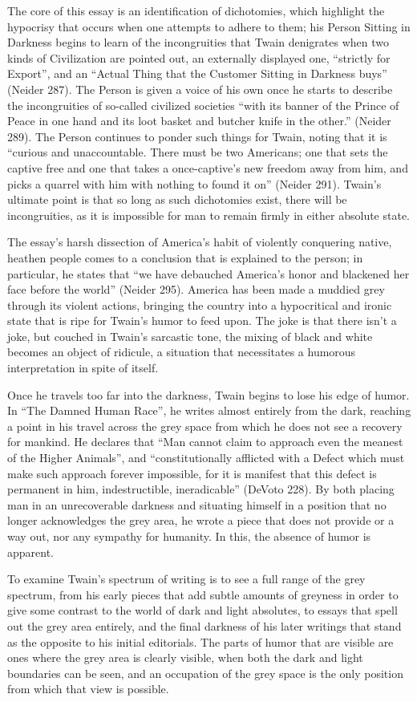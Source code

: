 The core of this essay is an identification of dichotomies, which highlight the
hypocrisy that occurs when one attempts to adhere to them; his Person Sitting in
Darkness begins to learn of the incongruities that Twain denigrates when two
kinds of Civilization are pointed out, an externally displayed one, ``strictly
for Export'', and an ``Actual Thing that the Customer Sitting in Darkness buys''
(Neider 287). The Person is given a voice of his own once he starts to describe
the incongruities of so-called civilized societies ``with its banner of the
Prince of Peace in one hand and its loot basket and butcher knife in the
other.'' (Neider 289).  The Person continues to ponder such things for Twain,
noting that it is ``curious and unaccountable. There must be two Americans; one
that sets the captive free and one that takes a once-captive's new freedom away
from him, and picks a quarrel with him with nothing to found it on'' (Neider
291). Twain's ultimate point is that so long as such dichotomies exist, there
will be incongruities, as it is impossible for man to remain firmly in either
absolute state.

The essay's harsh dissection of America's habit of violently conquering native,
heathen people comes to a conclusion that is explained to the person; in
particular, he states that ``we have debauched America's honor and blackened her
face before the world'' (Neider 295). America has been made a muddied grey
through its violent actions, bringing the country into a hypocritical and ironic
state that is ripe for Twain's humor to feed upon. The joke is that there isn't
a joke, but couched in Twain's sarcastic tone, the mixing of black and white
becomes an object of ridicule, a situation that necessitates a humorous
interpretation in spite of itself.

Once he travels too far into the darkness, Twain begins to lose his edge of
humor. In ``The Damned Human Race'', he writes almost entirely from the dark,
reaching a point in his travel across the grey space from which he does not see
a recovery for mankind. He declares that ``Man cannot claim to approach even the
meanest of the Higher Animals'', and ``constitutionally afflicted with a Defect
which must make such approach forever impossible, for it is manifest that this
defect is permanent in him, indestructible, ineradicable'' (DeVoto 228). By both
placing man in an unrecoverable darkness and situating himself in a position
that no longer acknowledges the grey area, he wrote a piece that does not
provide or a way out, nor any sympathy for humanity. In this, the absence of
humor is apparent.

To examine Twain's spectrum of writing is to see a full range of the grey
spectrum, from his early pieces that add subtle amounts of greyness in order to
give some contrast to the world of dark and light absolutes, to essays that
spell out the grey area entirely, and the final darkness of his later writings
that stand as the opposite to his initial editorials. The parts of humor that
are visible are ones where the grey area is clearly visible, when both the dark
and light boundaries can be seen, and an occupation of the grey space is the
only position from which that view is possible.

